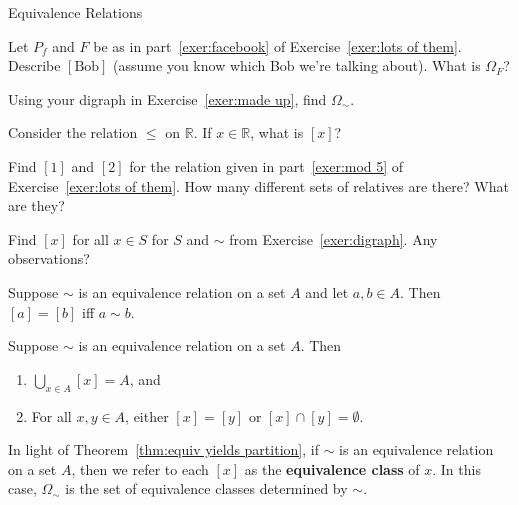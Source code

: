 \begin{section}{Equivalence Relations}
\begin{exercise}
Let $P_f$ and $F$ be as in part~\ref{exer:facebook} of Exercise~\ref{exer:lots of them}.  Describe $[\text{Bob}]$ (assume you know which Bob we're talking about).  What is $\Omega_F$?
\end{exercise}

\begin{exercise}
Using your digraph in Exercise~\ref{exer:made up}, find $\Omega_{\sim}$.  
\end{exercise}

\begin{exercise}
Consider the relation $\leq$ on $\mathbb{R}$.  If $x\in \mathbb{R}$, what is $[x]$?
\end{exercise}

\begin{exercise}
Find $[1]$ and $[2]$ for the relation given in part~\ref{exer:mod 5} of Exercise~\ref{exer:lots of them}.  How many different sets of relatives are there?  What are they?
\end{exercise}

\begin{exercise}
Find $[x]$ for all $x\in S$ for $S$ and $\sim$ from Exercise~\ref{exer:digraph}.  Any observations?
\end{exercise}

\begin{theorem}\label{thm:related iff same class}
Suppose $\sim$ is an equivalence relation on a set $A$ and let $a,b\in A$.  Then $[a]=[b]$ iff $a\sim b$.
\end{theorem}

\begin{theorem}\label{thm:equiv yields partition}
Suppose $\sim$ is an equivalence relation on a set $A$.  Then
\begin{enumerate}[label=\textrm{(\alph*)}]
\item $\bigcup_{x\in A}[x]=A$, and
\item For all $x,y\in A$, either $[x]=[y]$ or $[x]\cap [y]=\emptyset$.
\end{enumerate}
\end{theorem}

\begin{definition}
In light of Theorem~\ref{thm:equiv yields partition}, if $\sim$ is an equivalence relation on a set $A$, then we refer to each $[x]$ as the \textbf{equivalence class} of $x$.  In this case, $\Omega_{\sim}$ is the set of equivalence classes determined by $\sim$.
\end{definition}


\end{section}
